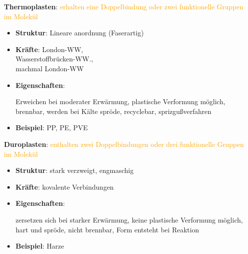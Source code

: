 \begin{minipage}[t]{0.4\textwidth}
    \textbf{Thermoplasten}: \textcolor{orange}{erhalten eine Doppelbindung oder zwei funktionelle Gruppen im Molekül}
    \begin{itemize}
        \item \textbf{Struktur}: Lineare anordnung (Faserartig)
        \item \textbf{Kräfte}: London-WW, \\ Wasserstoffbrücken-WW., \\ machmal London-WW
        \item \textbf{Eigenschaften}:
        \par Erweichen bei moderater Erwärmung, plastische Verformung möglich, brennbar, werden bei Kälte spröde, recyclebar, sprizgußverfahren
        \item \textbf{Beispiel}: PP, PE, PVE
    \end{itemize}

\end{minipage}
\hspace{0.5cm}
\vrule width 0.4pt
\hspace{0.5cm}
\begin{minipage}[t]{0.45\textwidth}

    \textbf{Duroplasten}: \textcolor{orange}{enthalten zwei Doppelbindungen oder drei funktionelle Gruppen im Molekül}
    \begin{itemize}
        \item \textbf{Struktur}: stark verzweigt, engmaschig
        \item \textbf{Kräfte}: kovalente Verbindungen
        \item \textbf{Eigenschaften}:
        \par zersetzen sich bei starker Erwärmung, keine plastische Verformung möglich, hart und spröde, nicht brennbar, Form entsteht bei Reaktion
        \item \textbf{Beispiel}: Harze
    \end{itemize}

\end{minipage}

\vspace{0.3cm}

